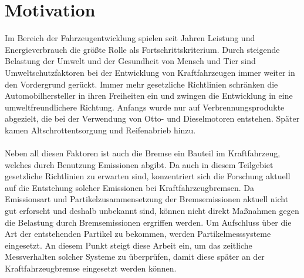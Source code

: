 \section{Motivation}
Im Bereich der Fahrzeugentwicklung spielen seit Jahren Leistung und Energieverbrauch die gr\"{o}{\ss}te Rolle als Fortschrittskriterium. Durch steigende Belastung der Umwelt und der Gesundheit von Mensch und Tier sind Umweltschutzfaktoren bei der Entwicklung von Kraftfahrzeugen immer weiter in den Vordergrund ger\"{u}ckt. Immer mehr gesetzliche Richtlinien schr\"{a}nken die Automobilhersteller in ihren Freiheiten ein und zwingen die Entwicklung in eine umweltfreundlichere Richtung. Anfangs wurde nur auf Verbrennungsprodukte abgezielt, die bei der Verwendung von Otto- und Dieselmotoren entstehen. Sp\"{a}ter kamen Altschrottentsorgung und Reifenabrieb hinzu. 
\\\\
Neben all diesen Faktoren ist auch die Bremse ein Bauteil im Kraftfahrzeug, welches durch Benutzung Emissionen abgibt. Da auch in diesem Teilgebiet gesetzliche Richtlinien zu erwarten sind, konzentriert sich die Forschung aktuell auf die Entstehung solcher Emissionen bei Kraftfahrzeugbremsen. Da Emissionsart und Partikelzusammensetzung der Bremsemissionen aktuell nicht gut erforscht und deshalb unbekannt sind, k\"{o}nnen nicht direkt Ma{\ss}nahmen gegen die Belastung durch Bremsemissionen ergriffen werden. Um Aufschluss \"{u}ber die Art der entstehenden Partikel zu bekommen, werden Partikelmesssysteme eingesetzt. An diesem Punkt steigt diese Arbeit ein, um das zeitliche Messverhalten solcher Systeme zu \"{u}berpr\"{u}fen, damit diese sp\"{a}ter an der Kraftfahrzeugbremse eingesetzt werden k\"{o}nnen.